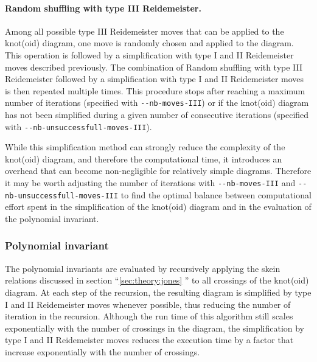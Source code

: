 \paragraph{Random shuffling with type III Reidemeister.}
Among all possible type III Reidemeister moves that can be applied to the knot(oid) diagram, one move is randomly chosen and applied to the diagram.
This operation is followed by a simplification with  type I and II Reidemeister moves described previously.
The combination of Random shuffling with type III Reidemeister followed by a simplification with  type I and II Reidemeister moves is then repeated multiple times. This procedure stops after reaching a maximum number of iterations (specified with \lstinline{--nb-moves-III}) or if the knot(oid) diagram has not been simplified during a given number of consecutive iterations (specified with \lstinline{--nb-unsuccessfull-moves-III}).

While this simplification method can strongly reduce the complexity of the knot(oid) diagram, and therefore the computational time, it introduces an overhead that can become non-negligible for relatively simple diagrams. Therefore it may be worth adjusting the number of iterations with \lstinline{--nb-moves-III} and \lstinline{--nb-unsuccessfull-moves-III} to find the optimal balance between computational effort spent in the simplification of the knot(oid) diagram and in the evaluation of the polynomial invariant.


\subsubsection{\label{sec:algorithms:jonespolynomial}Polynomial invariant}
The polynomial invariants are evaluated by recursively applying the skein relations discussed in section ``\ref{sec:theory:jones} '' to all crossings of the knot(oid) diagram. At each step of the recursion, the resulting diagram is simplified by type I and II Reidemeister moves whenever possible, thus reducing the number of iteration in the recursion. Although the run time of this algorithm still scales exponentially with the number of crossings in the diagram, the simplification by type I and II Reidemeister moves reduces the execution time by a factor that increase exponentially with the number of crossings.


